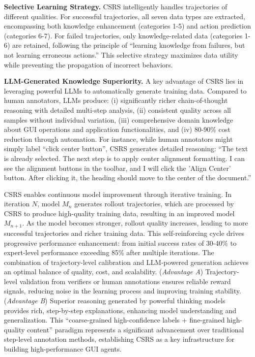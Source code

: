 \textbf{Selective Learning Strategy.}
CSRS intelligently handles trajectories of different qualities. For successful trajectories, all seven data types are extracted, encompassing both knowledge enhancement (categories 1-5) and action prediction (categories 6-7). For failed trajectories, only knowledge-related data (categories 1-6) are retained, following the principle of ``learning knowledge from failures, but not learning erroneous actions.'' This selective strategy maximizes data utility while preventing the propagation of incorrect behaviors.

\textbf{LLM-Generated Knowledge Superiority.}
A key advantage of CSRS lies in leveraging powerful LLMs to automatically generate training data. Compared to human annotators, LLMs produce: (i) significantly richer chain-of-thought reasoning with detailed multi-step analysis, (ii) consistent quality across all samples without individual variation, (iii) comprehensive domain knowledge about GUI operations and application functionalities, and (iv) 80-90\% cost reduction through automation. For instance, while human annotators might simply label ``click center button'', CSRS generates detailed reasoning: ``The text is already selected. The next step is to apply center alignment formatting. I can see the alignment buttons in the toolbar, and I will click the 'Align Center' button. After clicking it, the heading should move to the center of the document.''

CSRS enables continuous model improvement through iterative training. In iteration $N$, model $M_n$ generates rollout trajectories, which are processed by CSRS to produce high-quality training data, resulting in an improved model $M_{n+1}$. As the model becomes stronger, rollout quality increases, leading to more successful trajectories and richer training data. This self-reinforcing cycle drives progressive performance enhancement: from initial success rates of 30-40\% to expert-level performance exceeding 85\% after multiple iterations.
The combination of trajectory-level calibration and LLM-powered generation achieves an optimal balance of quality, cost, and scalability. (\textit{Advantage A}) Trajectory-level validation from verifiers or human annotations ensures reliable reward signals, reducing noise in the learning process and improving training stability. (\textit{Advantage B}) Superior reasoning generated by powerful thinking models provides rich, step-by-step explanations, enhancing model understanding and generalization. This ``coarse-grained high-confidence labels + fine-grained high-quality content'' paradigm represents a significant advancement over traditional step-level annotation methods, establishing CSRS as a key infrastructure for building high-performance GUI agents.


